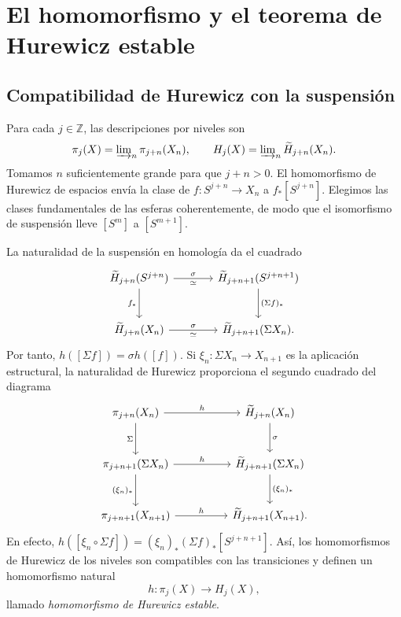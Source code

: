 \section{El homomorfismo y el teorema de Hurewicz estable}

\subsection{Compatibilidad de Hurewicz con la suspensión}
Para cada $j\in\mathbb Z$, las descripciones por niveles son
\[
\pi_j(X)=\varinjlim\nolimits_n\pi_{j+n}(X_n),
\qquad
H_j(X)=\varinjlim\nolimits_n\widetilde H_{j+n}(X_n).
\]
Tomamos $n$ suficientemente grande para que $j+n>0$. El homomorfismo de Hurewicz de espacios envía la clase de $f\colon S^{j+n}\to X_n$ a $f_*[S^{j+n}]$. Elegimos las clases fundamentales de las esferas coherentemente, de modo que el isomorfismo de suspensión lleve $[S^m]$ a $[S^{m+1}]$.

La naturalidad de la suspensión en homología da el cuadrado
\[
\begin{tikzcd}[column sep=large,row sep=large]
\widetilde H_{j+n}(S^{j+n})\arrow[r,"\sigma","\simeq"']\arrow[d,"f_*"']
&\widetilde H_{j+n+1}(S^{j+n+1})\arrow[d,"(\Sigma f)_*"]\\
\widetilde H_{j+n}(X_n)\arrow[r,"\sigma","\simeq"']
&\widetilde H_{j+n+1}(\Sigma X_n).
\end{tikzcd}
\]
Por tanto, $h([\Sigma f])=\sigma h([f])$. Si $\xi_n\colon\Sigma X_n\to X_{n+1}$ es la aplicación estructural, la naturalidad de Hurewicz proporciona el segundo cuadrado del diagrama
\[
\begin{tikzcd}[column sep=huge,row sep=large]
\pi_{j+n}(X_n)\arrow[r,"h"]\arrow[d,"\Sigma"']
&\widetilde H_{j+n}(X_n)\arrow[d,"\sigma"]\\
\pi_{j+n+1}(\Sigma X_n)\arrow[r,"h"]\arrow[d,"(\xi_n)_*"']
&\widetilde H_{j+n+1}(\Sigma X_n)\arrow[d,"(\xi_n)_*"]\\
\pi_{j+n+1}(X_{n+1})\arrow[r,"h"]&\widetilde H_{j+n+1}(X_{n+1}).
\end{tikzcd}
\]
En efecto, $h([\xi_n\circ\Sigma f])=(\xi_n)_*(\Sigma f)_*[S^{j+n+1}]$. Así, los homomorfismos de Hurewicz de los niveles son compatibles con las transiciones y definen un homomorfismo natural
\[
h\colon\pi_j(X)\longrightarrow H_j(X),
\]
llamado \emph{homomorfismo de Hurewicz estable}.

